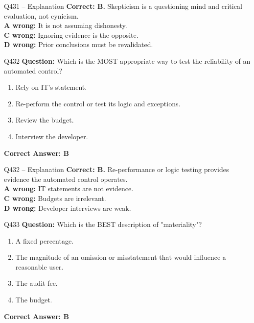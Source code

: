 \documentclass[aspectratio=169,10pt]{beamer}
\begin{document}
	\begin{frame}[t]{Q431 -- Explanation}
		\small
		\textbf{Correct: B.} Skepticism is a questioning mind and critical evaluation, not cynicism. \\[4pt]
		\textbf{A wrong:} It is not assuming dishonesty. \\[2pt]
		\textbf{C wrong:} Ignoring evidence is the opposite. \\[2pt]
		\textbf{D wrong:} Prior conclusions must be revalidated.
	\end{frame}
	
	\begin{frame}[t]{Q432}
		\small
		\textbf{Question:} Which is the MOST appropriate way to test the reliability of an automated control?
		\begin{enumerate}[label=\Alph*.,itemsep=1pt,topsep=2pt]
			\item Rely on IT's statement.
			\item Re-perform the control or test its logic and exceptions.
			\item Review the budget.
			\item Interview the developer.
		\end{enumerate}
		\vspace{4pt}
		\textbf{Correct Answer: B}
	\end{frame}
	
	\begin{frame}[t]{Q432 -- Explanation}
		\small
		\textbf{Correct: B.} Re-performance or logic testing provides evidence the automated control operates. \\[4pt]
		\textbf{A wrong:} IT statements are not evidence. \\[2pt]
		\textbf{C wrong:} Budgets are irrelevant. \\[2pt]
		\textbf{D wrong:} Developer interviews are weak.
	\end{frame}
	
	\begin{frame}[t]{Q433}
		\small
		\textbf{Question:} Which is the BEST description of "materiality"?
		\begin{enumerate}[label=\Alph*.,itemsep=1pt,topsep=2pt]
			\item A fixed percentage.
			\item The magnitude of an omission or misstatement that would influence a reasonable user.
			\item The audit fee.
			\item The budget.
		\end{enumerate}
		\vspace{4pt}
		\textbf{Correct Answer: B}
	\end{frame}
	
\end{document}
